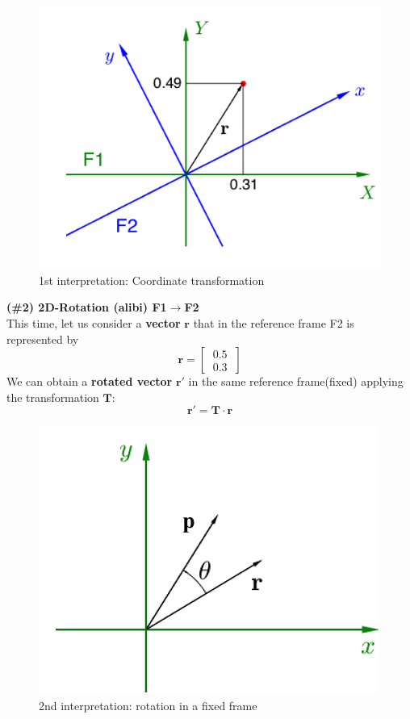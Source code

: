 \begin{figure}[h]
    \centering
    \includegraphics[scale=0.6]{AerospaceApplications/images/coord_transf.png}
    \caption{1st interpretation: Coordinate transformation}
\end{figure}

\noindent
{\color{blue} \textbf{(\#2) 2D-Rotation (alibi) F1$\to$F2}}\\
This time, let us consider a \textbf{vector} $\mathbf{r}$ that in the reference frame F2 is represented by
\begin{equation*}
    \mathbf{r} = \begin{bmatrix}
        \ 0.5 \ \\
        \ 0.3 \
    \end{bmatrix}
\end{equation*}
We can obtain a \textbf{rotated vector} $\mathbf{r}'$ in the same reference frame(fixed) applying the transformation $\mathbf{T}$: 
\begin{equation*}
    \mathbf{r}'=\mathbf{T}\cdot\mathbf{r}
\end{equation*}

\begin{figure}[h]
    \centering
    \includegraphics[scale=1]{AerospaceApplications/images/rotation_transf.png}
    \caption{2nd interpretation: rotation in a fixed frame}
\end{figure}

